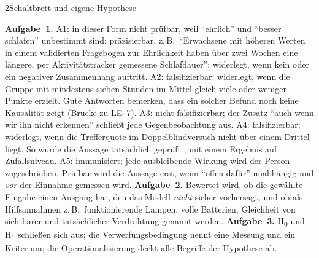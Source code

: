 \begin{uebungsblattb}{2}{Schaltbrett und eigene Hypothese}
\begin{lehrhinweis}[Erwartungshorizont]
\textbf{Aufgabe~1.} A1: in dieser Form nicht prüfbar, weil
\enquote{ehrlich} und \enquote{besser schlafen} unbestimmt sind;
präzisierbar, z.\,B.\ \enquote{Erwachsene mit höheren Werten in einem
validierten Fragebogen zur Ehrlichkeit haben über zwei Wochen eine längere,
per Aktivitätstracker gemessene Schlafdauer}; widerlegt, wenn kein oder ein
negativer Zusammenhang auftritt. A2: falsifizierbar; widerlegt, wenn die
Gruppe mit mindestens sieben Stunden im Mittel gleich viele oder weniger
Punkte erzielt. Gute Antworten bemerken, dass ein solcher Befund noch
keine Kausalität zeigt (Brücke zu LE~7). A3: nicht falsifizierbar; der
Zusatz \enquote{auch wenn wir ihn nicht erkennen} schließt jede
Gegenbeobachtung aus. A4: falsifizierbar; widerlegt, wenn die
Trefferquote im Doppelblindversuch nicht über einem Drittel liegt. So
wurde die Aussage tatsächlich geprüft \parencite{carlson1985doubleblind},
mit einem Ergebnis auf Zufallsniveau. A5: immunisiert; jede ausbleibende
Wirkung wird der Person zugeschrieben. Prüfbar wird die Aussage erst, wenn
\enquote{offen dafür} unabhängig und \emph{vor} der Einnahme gemessen wird.
\textbf{Aufgabe~2.} Bewertet wird, ob die gewählte Eingabe einen
Ausgang hat, den das Modell \emph{nicht} sicher vorhersagt, und ob als
Hilfsannahmen z.\,B.\ funktionierende Lampen, volle Batterien, Gleichheit
von sichtbarer und tatsächlicher Verdrahtung genannt werden.
\textbf{Aufgabe~3.} H\textsubscript{0} und H\textsubscript{1} schließen
sich aus; die Verwerfungsbedingung nennt eine Messung und ein Kriterium;
die Operationalisierung deckt alle Begriffe der Hypothese ab.
\end{lehrhinweis}
\end{uebungsblattb}

